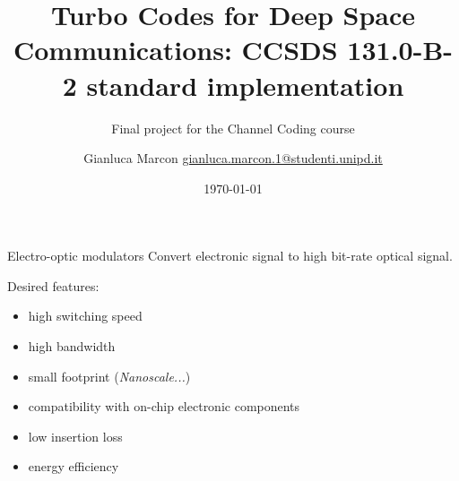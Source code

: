 \documentclass[handout,xcolor={usenames,dvipsnames},11pt]{beamer}
\title{ \Large Turbo Codes for Deep Space Communications: CCSDS 131.0-B-2 standard implementation}
\subtitle{Final project for the Channel Coding course}
\author[G. Marcon]{Gianluca Marcon \hfill \href{mailto:gianluca.marcon.1@studenti.unipd.it}{gianluca.marcon.1@studenti.unipd.it}}
\date{\today}
\institute{University of Padova}
\begin{document}
\maketitle

\begin{frame}{Electro-optic modulators}
    Convert electronic signal to high bit-rate optical signal.\pause

    Desired features:\pause
    \begin{itemize}
        \item high switching speed\pause
        \item high bandwidth\pause
        \item small footprint (\emph{Nanoscale...})\pause
        \item compatibility with on-chip electronic components\pause
        \item low insertion loss\pause
        \item energy efficiency
    \end{itemize}    
\end{frame}
\end{document}

